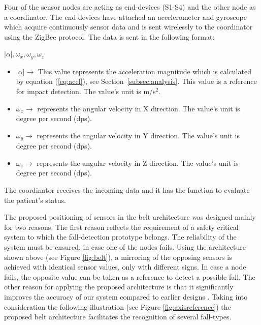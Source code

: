 \documentclass[journal]{IEEEtran}
\begin{document}
Four of the sensor nodes are acting as end-devices (S1-S4) and the other node as a coordinator. 
The end-devices have attached an accelerometer and gyroscope which acquire continuously sensor 
data and is sent wirelessly to the coordinator using the ZigBee protocol. The data is sent in the following format:
 \begin{center}
  $|\alpha|, \omega_{x}, \omega_{y}, \omega_{z}$
 \end{center}
\begin{itemize}
  \item $|\alpha| \rightarrow$ This value
    represents the acceleration magnitude which is calculated  
  by equation (\ref{eq:acel}), see Section~\ref{subsec:analysis}. This value is a reference for impact detection. 
  The value's unit is m/s$^2$.
  \item $\omega_{x} \rightarrow$ represents the angular velocity in X direction. The value's unit is 
  degree per second (dps).
  \item $\omega_{y} \rightarrow$ represents the angular velocity in Y direction. The value's unit is 
  degree per second (dps).
  \item $\omega_{z} \rightarrow$ represents the angular velocity in Z direction. The value's unit is degree per second (dps).
\end{itemize}
The coordinator receives the incoming data and it has the function to evaluate the patient's status.

The proposed positioning of sensors in the belt architecture was
designed mainly for two reasons. The first reason  
reflects the requirement of a safety critical system to which the
fall-detection prototype belongs. The reliability  
of the system must be ensured, in case one of the nodes fails. Using
the architecture shown above (see Figure \ref{fig:belt}),  
a mirroring of the opposing sensors is achieved with identical sensor values, only with different signs. 
In case a node fails, the opposite value can be taken as a reference to detect a possible fall. The other reason for 
applying the proposed architecture is that it significantly improves
the accuracy of our system compared to earlier designs \cite{LuigiMasterThesis}. Taking into 
consideration the following illustration (see Figure \ref{fig:axisreference}) the proposed belt architecture facilitates the recognition of several fall-types.
\end{document}
